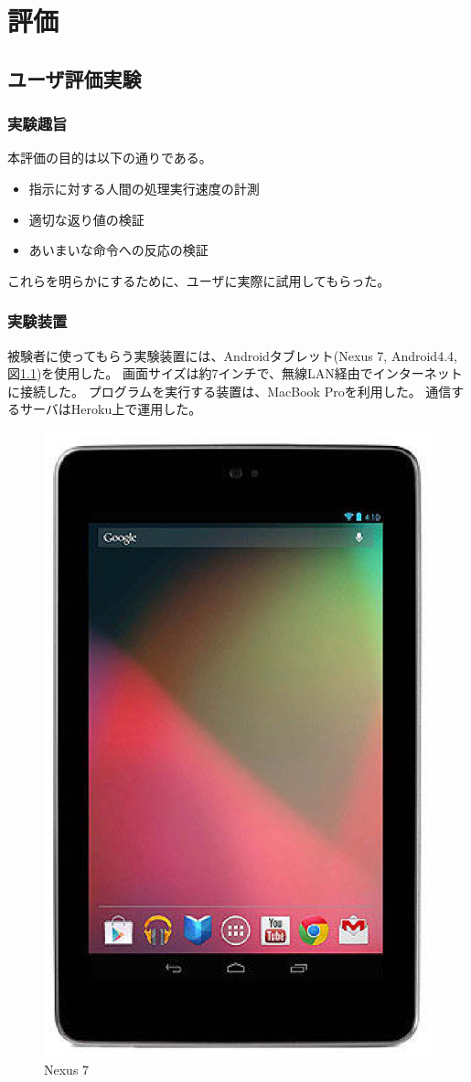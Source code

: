 \chapter{評価}\label{chap:evaluation}

\section{ユーザ評価実験}\label{sec:user-evaluation}

\subsection{実験趣旨}\label{ux5b9fux9a13ux8da3ux65e8}

本評価の目的は以下の通りである。

\begin{itemize}
\itemsep1pt\parskip0pt
\item
  指示に対する人間の処理実行速度の計測
\item
  適切な返り値の検証
\item
  あいまいな命令への反応の検証
\end{itemize}

これらを明らかにするために、ユーザに実際に試用してもらった。

\subsection{実験装置}\label{ux5b9fux9a13ux88c5ux7f6e}

被験者に使ってもらう実験装置には、Androidタブレット(Nexus 7, Android4.4,
図\ref{fig:nexus7})を使用した。
画面サイズは約7インチで、無線LAN経由でインターネットに接続した。
プログラムを実行する装置は、MacBook Proを利用した。
通信するサーバはHeroku上で運用した。

\begin{figure}[htbp]
  \begin{center}
  \includegraphics[width=.5\linewidth]{images/nexus7.eps}
  \end{center}
  \caption{Nexus 7}
  \label{fig:nexus7}
\end{figure}

